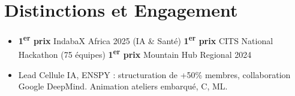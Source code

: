 \documentclass[a4paper,11pt]{article}
\begin{document}
\section{Distinctions et Engagement}
\begin{itemize}[leftmargin=*, nosep, label=\tiny$\bullet$]
    \item \small{\textbf{1\textsuperscript{er} prix} IndabaX Africa 2025 (IA \& Santé) \quad \textbf{1\textsuperscript{er} prix} CITS National Hackathon (75 équipes) \quad \textbf{1\textsuperscript{er} prix} Mountain Hub Regional 2024}
    \item \small{Lead Cellule IA, ENSPY : structuration de +50\% membres, collaboration Google DeepMind. Animation ateliers embarqué, C, ML.}
\end{itemize}
\end{document}
